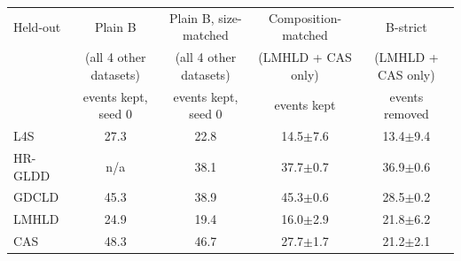 \begin{tabular}{lcccc}
\toprule
Held-out & Plain B & Plain B, size-matched & Composition-matched & B-strict \\
 & (all 4 other datasets) & (all 4 other datasets) & (LMHLD + CAS only) & (LMHLD + CAS only) \\
 & events kept, seed 0 & events kept, seed 0 & events kept & events removed \\
\midrule
L4S & 27.3 & 22.8 & 14.5$\pm$7.6 & 13.4$\pm$9.4 \\
HR-GLDD & n/a & 38.1 & 37.7$\pm$0.7 & 36.9$\pm$0.6 \\
GDCLD & 45.3 & 38.9 & 45.3$\pm$0.6 & 28.5$\pm$0.2 \\
LMHLD & 24.9 & 19.4 & 16.0$\pm$2.9 & 21.8$\pm$6.2 \\
CAS & 48.3 & 46.7 & 27.7$\pm$1.7 & 21.2$\pm$2.1 \\
\bottomrule
\end{tabular}
